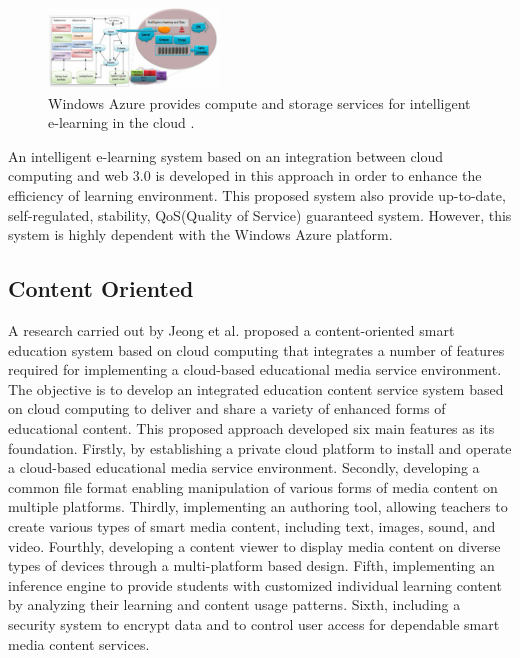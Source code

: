 \documentclass[journal]{vgtc}
\begin{document}
  \begin{figure}[t]
    \centering
    \includegraphics[width=0.4\textwidth]{win-azure}
    \caption{Windows Azure provides compute and storage services for intelligent e-learning in the cloud \cite{nasr2012proposed}.}
    \label{win-azure}
  \end{figure}

  An intelligent e-learning system based on an integration between cloud computing and web 3.0 is developed in this approach in order to enhance the efficiency of learning environment. This proposed system also provide up-to-date, self-regulated, stability, QoS(Quality of Service) guaranteed system. However, this system is highly dependent with the Windows Azure platform.

  \subsection{Content Oriented}
  A research carried out by Jeong et al. \cite{jeong2013cloud,jeong2013content} proposed a content-oriented smart education system based on cloud computing that integrates a number of features required for implementing a cloud-based educational media service environment. The objective is to develop an integrated education content service system based on cloud computing to deliver and share a variety of enhanced forms of educational content. This proposed approach developed six main features as its foundation. Firstly, by establishing a private cloud platform to install and operate a cloud-based educational media service environment. Secondly, developing a common file format enabling manipulation of various forms of media content on multiple platforms. Thirdly, implementing an authoring tool, allowing teachers to create various types of smart media content, including text, images, sound, and video. Fourthly, developing a content viewer to display media content on diverse types of devices through a multi-platform based design. Fifth, implementing an inference engine to provide students with customized individual learning content by analyzing their learning and content usage patterns. Sixth, including a security system to encrypt data and to control user access for dependable smart media content services.
\end{document}
